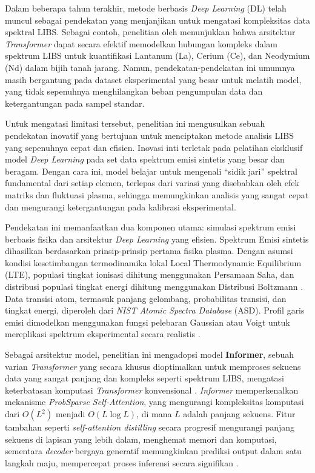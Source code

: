 Dalam beberapa tahun terakhir, metode berbasis \textit{Deep Learning} (DL) telah muncul sebagai pendekatan yang menjanjikan untuk mengatasi kompleksitas data spektral LIBS. Sebagai contoh, penelitian oleh \textcite{Yang2025} menunjukkan bahwa arsitektur \textit{Transformer} dapat secara efektif memodelkan hubungan kompleks dalam spektrum LIBS untuk kuantifikasi Lantanum (La), Cerium (Ce), dan Neodymium (Nd) dalam bijih tanah jarang. Namun, pendekatan-pendekatan ini umumnya masih bergantung pada dataset eksperimental yang besar untuk melatih model, yang tidak sepenuhnya menghilangkan beban pengumpulan data dan ketergantungan pada sampel standar.

Untuk mengatasi limitasi tersebut, penelitian ini mengusulkan sebuah pendekatan inovatif yang bertujuan untuk menciptakan metode analisis LIBS yang sepenuhnya cepat dan efisien. Inovasi inti terletak pada pelatihan eksklusif model \textit{Deep Learning} pada set data spektrum emisi sintetis yang besar dan beragam. Dengan cara ini, model belajar untuk mengenali ``sidik jari'' spektral fundamental dari setiap elemen, terlepas dari variasi yang disebabkan oleh efek matriks dan fluktuasi plasma, sehingga memungkinkan analisis yang sangat cepat dan mengurangi ketergantungan pada kalibrasi eksperimental.

Pendekatan ini memanfaatkan dua komponen utama: simulasi spektrum emisi berbasis fisika dan arsitektur \textit{Deep Learning} yang efisien. Spektrum Emisi sintetis dihasilkan berdasarkan prinsip-prinsip pertama fisika plasma. Dengan asumsi kondisi kesetimbangan termodinamika lokal Local Thermodynamic Equilibrium (LTE), populasi tingkat ionisasi dihitung menggunakan Persamaan Saha, dan distribusi populasi tingkat energi dihitung menggunakan Distribusi Boltzmann \parencite{Chandrasekhar1939, Panne2024}. Data transisi atom, termasuk panjang gelombang, probabilitas transisi, dan tingkat energi, diperoleh dari \textit{NIST Atomic Spectra Database} (ASD). Profil garis emisi dimodelkan menggunakan fungsi pelebaran Gaussian atau Voigt untuk mereplikasi spektrum eksperimental secara realistis \parencite{Miziolek2006}.

Sebagai arsitektur model, penelitian ini mengadopsi model \textbf{Informer}, sebuah varian \textit{Transformer} yang secara khusus dioptimalkan untuk memproses sekuens data yang sangat panjang dan kompleks seperti spektrum LIBS, mengatasi keterbatasan komputasi \textit{Transformer} konvensional \parencite{Zhou2021}. \textit{Informer} memperkenalkan mekanisme \textit{ProbSparse Self-Attention}, yang mengurangi kompleksitas komputasi dari $O(L^2)$ menjadi $O(L \log L)$, di mana $L$ adalah panjang sekuens. Fitur tambahan seperti \textit{self-attention distilling} secara progresif mengurangi panjang sekuens di lapisan yang lebih dalam, menghemat memori dan komputasi, sementara \textit{decoder} bergaya generatif memungkinkan prediksi output dalam satu langkah maju, mempercepat proses inferensi secara signifikan \parencite{Zhou2021}.

